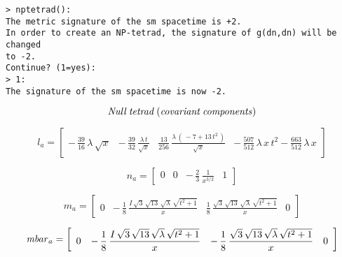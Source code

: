 \documentclass{article}
\begin{document}
{\noindent\texttt{> nptetrad():}\\
\indent\texttt{The metric signature of the sm spacetime is +2.}\\
\indent\texttt{In order to create an NP-tetrad, the signature of g(dn,dn)
 will be changed}\\
\indent\texttt{to -2.}\\
\indent\texttt{Continue? (1=yes):}\\
\noindent\texttt{> 1:}\\
\indent\texttt{The signature of the sm spacetime is now -2.\\}

\begin{maplelatex}
\[
{\it Null\:tetrad\:(covariant\:components)}
\]
\end{maplelatex}
\begin{maplelatex}
\[
{{l}_{{a}}}= \left[
{\begin{array}{cccc}
 - \,{\displaystyle \frac {39}{16}}\,{ \lambda}\,\sqrt {{x}} & 
 - \,{\displaystyle \frac {39}{32}}\,{\displaystyle \frac {{ 
\lambda}\,{t}}{\sqrt {{x}}}} & {\displaystyle \frac {13}{256}}\,
{\displaystyle \frac {{ \lambda}\,(\, - 7 + 13\,{t}^{2}\,)}{
\sqrt {{x}}}} &  - \,{\displaystyle \frac {507}{512}}\,{ \lambda}
\,{x}\,{t}^{2} - {\displaystyle \frac {663}{512}}\,{ \lambda}\,{x
}
\end{array}}
\right] 
\]
\end{maplelatex}
\begin{maplelatex}
\[
{{n}_{{a}}}= \left[
{\begin{array}{rrcr}
0 & 0 &  - \,{\displaystyle \frac {2}{3}}\,{\displaystyle \frac {
1}{{x}^{3/2}}} & 1
\end{array}}
\right] 
\]
\end{maplelatex}
\begin{maplelatex}
\[
{{m}_{{a}}}= \left[
{\begin{array}{rccr}
0 &  - \,{\displaystyle \frac {1}{8}}\,{\displaystyle \frac {{I}
\,\sqrt {3}\,\sqrt {13}\,\sqrt {{ \lambda}}\,\sqrt {{t}^{2} + 1}
}{{x}}} & {\displaystyle \frac {1}{8}}\,{\displaystyle \frac {
\sqrt {3}\,\sqrt {13}\,\sqrt {{ \lambda}}\,\sqrt {{t}^{2} + 1}}{{
x}}} & 0
\end{array}}
\right] 
\]
\end{maplelatex}
\begin{maplelatex}
\[
{{\it mbar}_{{a}}}= \left[
{\begin{array}{rccr}
0 &  - \,{\displaystyle \frac {1}{8}}\,{\displaystyle \frac {{I}
\,\sqrt {3}\,\sqrt {13}\,\sqrt {{ \lambda}}\,\sqrt {{t}^{2} + 1}
}{{x}}} &  - \,{\displaystyle \frac {1}{8}}\,{\displaystyle 
\frac {\sqrt {3}\,\sqrt {13}\,\sqrt {{ \lambda}}\,\sqrt {{t}^{2}
 + 1}}{{x}}} & 0
\end{array}}
\right] 
\]
\end{maplelatex}

}
\end{document}
